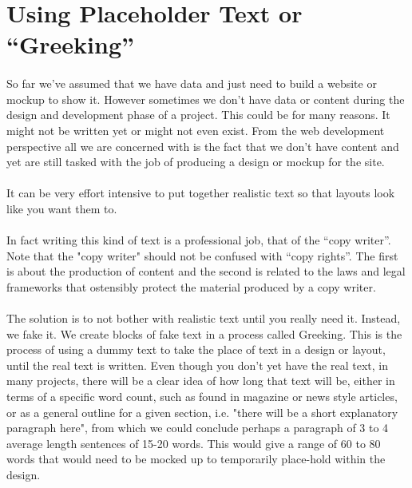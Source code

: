 \section{Using Placeholder Text or ``Greeking''}
\paragraph{} So far we’ve assumed that we have data and just need to build a website or mockup to show it. However sometimes we don’t have data or content during the design and development phase of a project. This could be for many reasons. It might not be written yet or might not even exist. From the web development perspective all we are concerned with is the fact that we don't have content and yet are still tasked with the job of producing a design or mockup for the site.
\paragraph{} It can be very effort intensive to put together realistic text so that layouts look like you want them to.
\paragraph{} In fact writing this kind of text is a professional job, that of the “copy writer”. Note that the "copy writer" should not be confused with “copy rights”. The first is about the production of content and the second is related to the laws and legal frameworks that ostensibly protect the material produced by a copy writer.
\paragraph{} The solution is to not bother with realistic text until you really need it. Instead, we fake it. We create blocks of fake text in a process called Greeking. This is the process of using a dummy text to take the place of text in a design or layout, until the real text is written. Even though you don't yet have the real text, in many projects, there will be a clear idea of how long that text will be, either in terms of a specific word count, such as found in magazine or news style articles, or as a general outline for a given section, i.e. "there will be a short explanatory paragraph here", from which we could conclude perhaps a paragraph of 3 to 4 average length sentences of 15-20 words. This would give a range of 60 to 80 words that would need to be mocked up to temporarily place-hold within the design.
